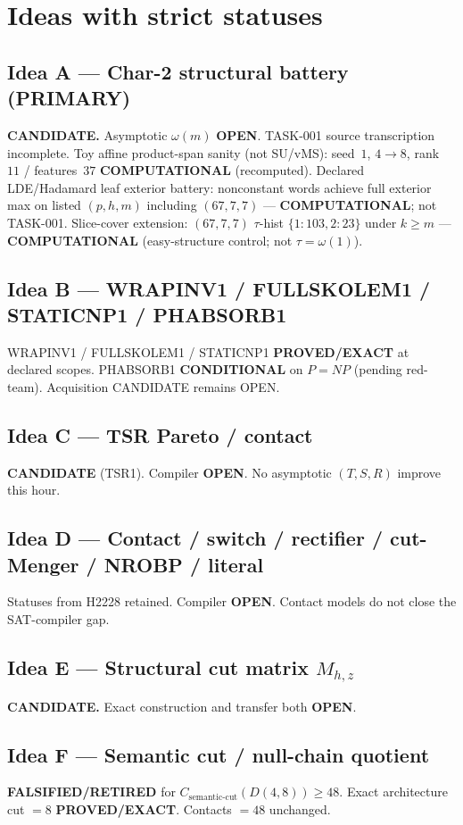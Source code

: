 \documentclass[11pt]{article}
\begin{document}
\section*{Ideas with strict statuses}
\subsection*{Idea A --- Char-2 structural battery (PRIMARY)}
\textbf{CANDIDATE.} Asymptotic $\omega(m)$ \textbf{OPEN}. TASK-001 source transcription incomplete.
Toy affine product-span sanity (not SU/vMS): seed~$1$, $4\to8$, rank~$11$ / features~$37$
\textbf{COMPUTATIONAL} (recomputed).
Declared LDE/Hadamard leaf exterior battery: nonconstant words achieve full exterior max on
listed $(p,h,m)$ including $(67,7,7)$ --- \textbf{COMPUTATIONAL}; not TASK-001.
Slice-cover extension: $(67,7,7)$ $\tau$-hist $\{1{:}103,2{:}23\}$ under $k{\ge}m$ ---
\textbf{COMPUTATIONAL} (easy-structure control; not $\tau=\omega(1)$).

\subsection*{Idea B --- WRAPINV1 / FULLSKOLEM1 / STATICNP1 / PHABSORB1}
WRAPINV1 / FULLSKOLEM1 / STATICNP1 \textbf{PROVED/EXACT} at declared scopes.
PHABSORB1 \textbf{CONDITIONAL} on $P=NP$ (pending red-team). Acquisition CANDIDATE remains OPEN.

\subsection*{Idea C --- TSR Pareto / contact}
\textbf{CANDIDATE} (TSR1). Compiler \textbf{OPEN}. No asymptotic $(T,S,R)$ improve this hour.

\subsection*{Idea D --- Contact / switch / rectifier / cut-Menger / NROBP / literal}
Statuses from H2228 retained. Compiler \textbf{OPEN}. Contact models do not close the SAT-compiler gap.

\subsection*{Idea E --- Structural cut matrix $M_{h,z}$}
\textbf{CANDIDATE.} Exact construction and transfer both \textbf{OPEN}.

\subsection*{Idea F --- Semantic cut / null-chain quotient}
\textbf{FALSIFIED/RETIRED} for $C_{\mathrm{semantic\textrm{-}cut}}(D(4,8))\ge48$.
Exact architecture cut $=8$ \textbf{PROVED/EXACT}. Contacts $=48$ unchanged.
\end{document}
